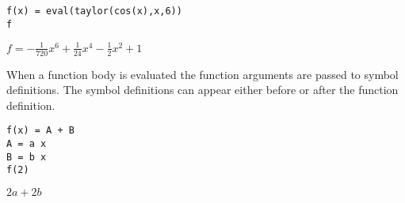 \begin{Verbatim}[formatcom=\color{blue}]
f(x) = eval(taylor(cos(x),x,6))
f
\end{Verbatim}

$\displaystyle f=-\frac{1}{720}x^6+\frac{1}{24}x^4-\frac{1}{2}x^2+1$

When a function body is evaluated the function arguments
are passed to symbol definitions.
The symbol definitions can appear either before or after
the function definition.

\begin{Verbatim}[formatcom=\color{blue}]
f(x) = A + B
A = a x
B = b x
f(2)
\end{Verbatim}

$\displaystyle 2a+2b$

